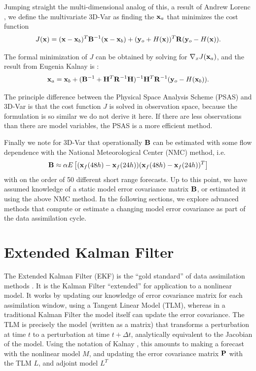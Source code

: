 \documentclass[12pt]{report}
\begin{document}
Jumping straight the multi-dimensional analog of this, a result of Andrew Lorenc , we define the multivariate 3D-Var as finding the $\mathbf{x} _a$ that minimizes the cost function
\begin{equation} J(\mathbf{x}) = (\mathbf{x} - \mathbf{x}_b) ^T \mathbf{B} ^{-1} (\mathbf{x} - \mathbf{x}_b) + (\mathbf{y}_o + H(\mathbf{x}))^T\mathbf{R} (\mathbf{y}_o - H(\mathbf{x})) .\end{equation}

The formal minimization of $J$ can be obtained by solving for $\nabla_x J(\mathbf{x}_a)$, and the result from Eugenia Kalnay is :
\begin{equation} \mathbf{x}_a = \mathbf{x}_b+(\mathbf{B}^{-1} + \mathbf{H}^T\mathbf{R}^{-1}\mathbf{H})^{-1}\mathbf{H}^T\mathbf{R}^{-1}(\mathbf{y}_o-H(\mathbf{x}_b)) .\end{equation}

The principle difference between the Physical Space Analysis Scheme (PSAS) and 3D-Var is that the cost function $J$ is solved in observation space, because the formulation is so similar we do not derive it here.
If there are less observations than there are model variables, the PSAS is a more efficient method.

Finally we note for 3D-Var that operationally $\mathbf{B}$ can be estimated with some flow dependence with the National Meteorological Center (NMC) method, i.e.
\begin{equation} \mathbf{B} \approx \alpha E \left [ (\mathbf{x}_f(48h)-\mathbf{x}_f(24h))(\mathbf{x}_f(48h)-\mathbf{x}_f(24h))^T \right ] \end{equation}
with on the order of 50 different short range forecasts.
Up to this point, we have assumed knowledge of a static model error covariance matrix $\mathbf{B}$, or estimated it using the above NMC method.
In the following sections, we explore advanced methods that compute or estimate a changing model error covariance as part of the data assimilation cycle.

\section{Extended Kalman Filter}

The Extended Kalman Filter (EKF) is the ``gold standard'' of data assimilation methods .
It is the Kalman Filter ``extended'' for application to a nonlinear model.
It works by updating our knowledge of error covariance matrix for each assimilation window, using a Tangent Linear Model (TLM), whereas in a traditional Kalman Filter the model itself can update the error covariance.
The TLM is precisely the model (written as a matrix) that transforms a perturbation at time $t$ to a perturbation at time $t+\Delta t$, analytically equivalent to the Jacobian of the model.
Using the notation of Kalnay \cite{kalnay2003}, this amounts to making a forecast with the nonlinear model $M$, and updating the error covariance matrix $\mathbf{P}$ with the TLM $L$, and adjoint model $L^T$
\end{document}
